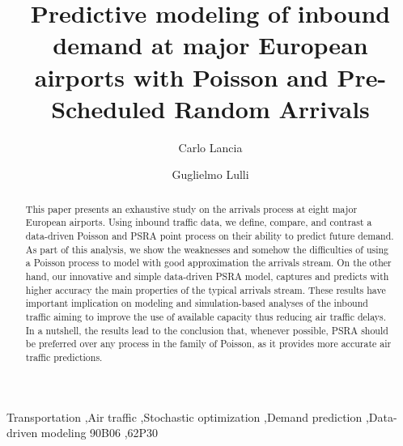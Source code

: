 \documentclass[]{elsarticle}
\begin{document}
\begin{frontmatter}

\title{Predictive modeling of inbound demand at major European airports with Poisson and Pre-Scheduled Random Arrivals}

\author[address_cl]{Carlo Lancia}

\author[address_gl]{Guglielmo Lulli}

\address[address_cl]{Leiden University Mathematical Institute, Niels Bohrweg 1, 2333 CA, Leiden, NL}
\address[address_gl]{Lancaster University Management School, Bailrigg, Lancaster, LA1 4YX, UK}

\begin{abstract}
  This paper presents an exhaustive study on the arrivals process at eight major European airports. Using inbound traffic data, we define, compare, and contrast a data-driven Poisson and \ac{PSRA} point process on their ability to predict future demand.
As part of this analysis, we show the weaknesses and somehow the difficulties of using a Poisson process to model with good approximation the arrivals stream. On the other hand, our innovative and simple data-driven \ac{PSRA} model, captures and predicts with higher accuracy the main properties of the typical arrivals stream.
These results have important implication on modeling and simulation-based analyses of the inbound traffic aiming to improve the use of available capacity thus reducing air traffic delays. In a nutshell, the results lead to the conclusion that, whenever possible, \ac{PSRA} should be preferred over any process in the family of Poisson, as it provides more accurate air traffic predictions.
\end{abstract}


\begin{keyword}
Transportation \sep Air traffic \sep Stochastic optimization \sep Demand prediction \sep Data-driven modeling
\MSC[2010] 90B06 \sep  62P30
\end{keyword}

\end{frontmatter}
\end{document}

